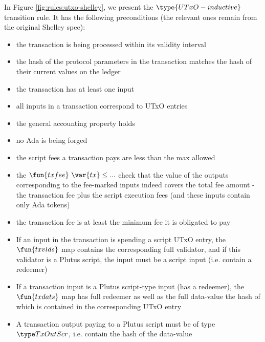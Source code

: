 In Figure \ref{fig:rules:utxo-shelley}, we present the $\type{UTxO-inductive}$
transition rule. It has the following preconditions (the relevant ones remain
from the original Shelley spec):

\begin{itemize}
  \item the transaction is being processed within its validity interval

  \item the hash of the protocol parameters in the transaction matches
  the hash of their current values on the ledger

  \item the transaction has at least one input

  \item all inputs in a transaction correspond to UTxO entries

  \item the general accounting property holds

  \item no Ada is being forged

  \item the script fees a transaction pays are less than the max allowed

  \item the $\fun{txfee}~\var{tx} \leq ...$ check
  that the value of the outputs corresponding to the fee-marked inputs
  indeed covers the total fee amount - the transaction fee plus the
  script execution fees (and these inputs contain only
  Ada tokens)

  \item the transaction fee is at least the minimum fee it is obligated to pay

  \item If an input in the transaction is spending a script UTxO entry,
  the $\fun{txvlds}$ map contains the corresponding full validator, and
  if this validator is a Plutus script, the input must be a script input
  (i.e. contain a redeemer)

  \item If a transaction input is a Plutus script-type input (has a redeemer), the
  $\fun{txdats}$ map has full redeemer as well as the full data-value
  the hash of which is contained in the corresponding UTxO entry

  \item A transaction output paying to a Plutus script must be of type
  $\TxOutScr$, i.e. contain the hash of the data-value


\end{itemize}
